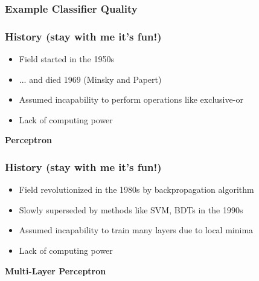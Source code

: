 \begin{frame}
    \frametitle{Example Classifier Quality}
    \begin{center}
    \end{center}
\end{frame}


\begin{frame}
    \frametitle{History (stay with me it's fun!)}
    \begin{center}
      \begin{itemize}
        \item Field started in the 1950s
        \item ... and died 1969 (Minsky and Papert)
        \item Assumed incapability to perform operations like exclusive-or
        \item Lack of computing power
      \end{itemize}
      

      \vspace{1em}
      \textbf{Perceptron}


    \end{center}
\end{frame}

\begin{frame}
    \frametitle{History (stay with me it's fun!)}
    \begin{center}
      \begin{itemize}
        \item Field revolutionized in the 1980s by backpropagation algorithm 
        \item Slowly superseded by methods like SVM, BDTs in the 1990s
        \item Assumed incapability to train many layers due to local minima 
        \item Lack of computing power
      \end{itemize}


      \vspace{1em}
      \textbf{Multi-Layer Perceptron}


    \end{center}
\end{frame}

